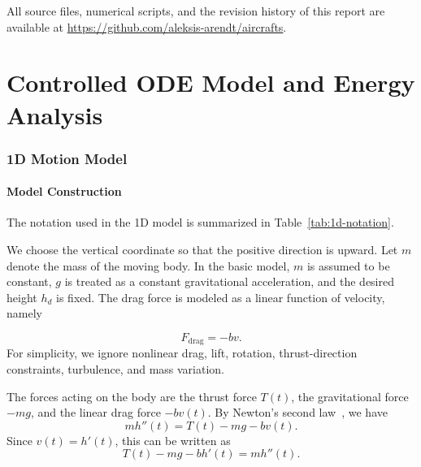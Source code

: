 ﻿\documentclass[12pt]{article}
\begin{document}
All source files, numerical scripts, and the revision history of this report
are available at \url{https://github.com/aleksis-arendt/aircrafts}.
\part{Controlled ODE Model and Energy Analysis}
\section{1D Motion Model}

\subsection{Model Construction}
The notation used in the 1D model is summarized in Table~\ref{tab:1d-notation}.

We choose the vertical coordinate so that the positive direction is upward. Let $m$ denote the mass of the moving body. In the basic model, $m$ is assumed to be constant, $g$ is treated as a constant gravitational acceleration, and the desired height $h_d$ is fixed. The drag force is modeled as a linear function of velocity, namely

\[
 F_{\mathrm{drag}} = -bv.
\]
For simplicity, we ignore nonlinear drag, lift, rotation, thrust-direction constraints, turbulence, and mass variation.

The forces acting on the body are the thrust force $T(t)$, the gravitational force $-mg$, and the linear drag force $-bv(t)$. By Newton's second law~\cite{arnold_classical_mechanics}, we have
\[
 m h''(t) = T(t) - mg - bv(t).
\]
Since $v(t) = h'(t)$, this can be written as
\begin{equation}\label{eq:newton-motion}
 T(t) - mg - bh'(t) = m h''(t).
\end{equation}
\end{document}

